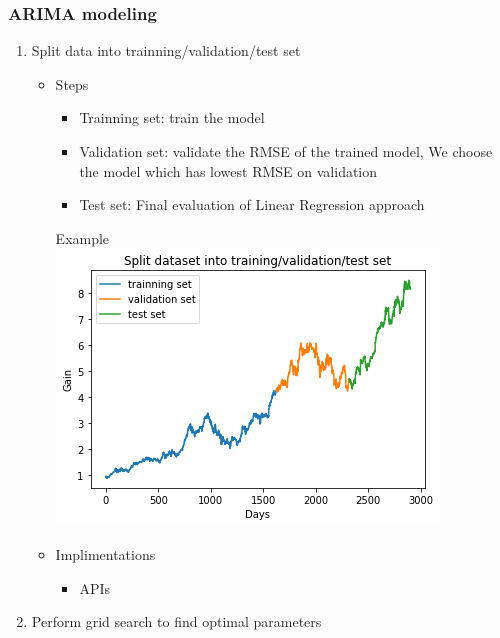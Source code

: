 \documentclass[11pt]{article}
\makeatletter
\def\maxwidth{\ifdim\Gin@nat@width>\linewidth\linewidth
    \else\Gin@nat@width\fi}
\let\Oldincludegraphics\includegraphics
\renewcommand{\includegraphics}[1]{\Oldincludegraphics[width=.8\maxwidth]{#1}}
\providecommand{\tightlist}{%
      \setlength{\itemsep}{0pt}\setlength{\parskip}{0pt}}
\newenvironment{Shaded}{}{}
\newcommand{\FloatTok}[1]{\textcolor[rgb]{0.25,0.63,0.44}{{#1}}}
\newcommand{\CommentTok}[1]{\textcolor[rgb]{0.38,0.63,0.69}{\textit{{#1}}}}
\newcommand{\NormalTok}[1]{{#1}}
\newcommand{\OperatorTok}[1]{\textcolor[rgb]{0.40,0.40,0.40}{{#1}}}
\makeatother
\begin{document}
\subsubsection{ARIMA modeling}\label{arima-modeling}

\begin{enumerate}
\def\labelenumi{\arabic{enumi}.}
\tightlist
\item
  Split data into trainning/validation/test set

  \begin{itemize}
  \tightlist
  \item
    Steps

    \begin{itemize}
    \tightlist
    \item
      Trainning set: train the model
    \item
      Validation set: validate the RMSE of the trained model, We choose
      the model which has lowest RMSE on validation
    \item
      Test set: Final evaluation of Linear Regression approach
    \end{itemize}

    Example \\
    \includegraphics{./figures/16.jpg}
  \item
    Implimentations

    \begin{itemize}
    \item
      APIs

\begin{Shaded}
\end{Shaded}
    \end{itemize}
  \end{itemize}
\item
  Perform grid search to find optimal parameters


\end{enumerate}
\end{document}
